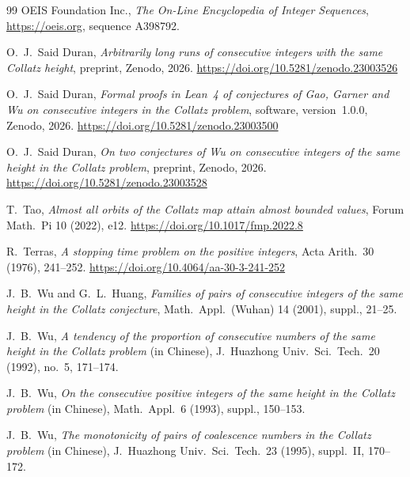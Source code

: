 \documentclass[11pt]{amsart}
\theoremstyle{definition}
\theoremstyle{remark}
\begin{document}
\begin{thebibliography}{99}
 OEIS Foundation Inc., \emph{The On-Line Encyclopedia of Integer Sequences}, \url{https://oeis.org}, sequence A398792.

 O.~J.~Said Duran, \emph{Arbitrarily long runs of consecutive integers with the same Collatz height}, preprint, Zenodo, 2026. \url{https://doi.org/10.5281/zenodo.23003526}

 O.~J.~Said Duran, \emph{Formal proofs in Lean~4 of conjectures of Gao, Garner and Wu on consecutive integers in the Collatz problem}, software, version~1.0.0, Zenodo, 2026. \url{https://doi.org/10.5281/zenodo.23003500}

 O.~J.~Said Duran, \emph{On two conjectures of Wu on consecutive integers of the same height in the Collatz problem}, preprint, Zenodo, 2026. \url{https://doi.org/10.5281/zenodo.23003528}

 T.~Tao, \emph{Almost all orbits of the Collatz map attain almost bounded values}, Forum Math.\ Pi 10 (2022), e12. \url{https://doi.org/10.1017/fmp.2022.8}

 R.~Terras, \emph{A stopping time problem on the positive integers}, Acta Arith.\ 30 (1976), 241--252. \url{https://doi.org/10.4064/aa-30-3-241-252}

 J.~B.~Wu and G.~L.~Huang, \emph{Families of pairs of consecutive integers of the same height in the Collatz conjecture}, Math.\ Appl.\ (Wuhan) 14 (2001), suppl., 21--25.

 J.~B.~Wu, \emph{A tendency of the proportion of consecutive numbers of the same height in the Collatz problem} (in Chinese), J.~Huazhong Univ.\ Sci.\ Tech.\ 20 (1992), no.~5, 171--174.

 J.~B.~Wu, \emph{On the consecutive positive integers of the same height in the Collatz problem} (in Chinese), Math.\ Appl.\ 6 (1993), suppl., 150--153.

 J.~B.~Wu, \emph{The monotonicity of pairs of coalescence numbers in the Collatz problem} (in Chinese), J.~Huazhong Univ.\ Sci.\ Tech.\ 23 (1995), suppl.~II, 170--172.

\end{thebibliography}
\end{document}
